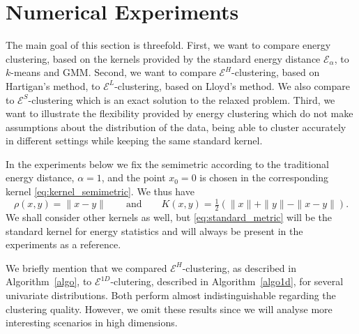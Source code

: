 \documentclass[aps,preprint,nofootinbib,floatfix]{revtex4-1}
\newcommand\kk{K}
\begin{document}
\section{Numerical Experiments}
\label{sec:numerics}



The main goal of this section is threefold. First, we want to compare
energy clustering, based on the kernels provided by the standard energy
distance $\mathcal{E}_\alpha$, to $k$-means and GMM. Second, we want
to compare $\mathcal{E}^H$-clustering, based on Hartigan's method, to
$\mathcal{E}^L$-clustering, based on Lloyd's method. We also compare
to $\mathcal{E}^S$-clustering
which is an exact solution to the relaxed problem.
Third, we want to illustrate the flexibility
provided by energy clustering which do not make assumptions about the
distribution of the data, being able to cluster accurately in different
settings while keeping the same standard kernel.

In the experiments below we fix the semimetric 
according to the traditional energy distance, $\alpha=1$, and
the point $x_0=0$ is chosen in the corresponding kernel  
\eqref{eq:kernel_semimetric}. We thus have
\begin{equation}
\label{eq:standard_metric}
\rho(x,y) = \| x-y\| \qquad \mbox{and} \qquad \kk(x,y) = 
\tfrac{1}{2}\left( \| x \| + \| y \| - \| x-y \| \right).
\end{equation}
We shall consider other kernels as well, 
but \eqref{eq:standard_metric} will be the
standard kernel for energy statistics and will always be present in the
experiments as a reference.

We briefly mention that we compared $\mathcal{E}^H$-clustering,
as described in Algorithm~\ref{algo}, to
$\mathcal{E}^{1D}$-clutering, described in Algorithm~\ref{algo1d}, 
for several univariate distributions.
Both perform almost indistinguishable regarding the clustering quality.
However, we omit these results since we will analyse more interesting 
scenarios in high dimensions.
\end{document}
